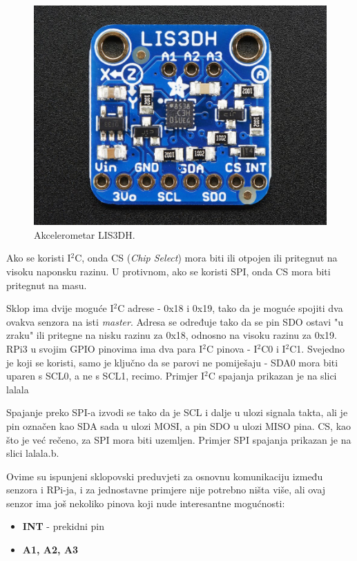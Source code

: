 \documentclass[12pt,a4paper]{article}
\begin{document}
		\begin{figure}[h!]
			\includegraphics[width=\linewidth]{slike/lis3dh.jpg}
			\caption{Akcelerometar LIS3DH.}
			\label{fig:lis3dh}
		\end{figure}

		\par Ako se koristi I$^2$C, onda CS (\textit{Chip Select}) mora biti ili otpojen ili pritegnut na visoku naponsku razinu. U protivnom, ako se koristi SPI, onda CS mora biti pritegnut na masu.

		\par Sklop ima dvije moguće I$^2$C adrese - 0x18 i 0x19, tako da je moguće spojiti dva ovakva senzora na isti \textit{master}. Adresa se određuje tako da se pin SDO ostavi "u zraku" ili pritegne na nisku razinu za 0x18, odnosno na visoku razinu za 0x19. \\
		RPi3 u svojim GPIO pinovima ima dva para I$^2$C pinova - I$^2$C0 i I$^2$C1. Svejedno je koji se koristi, samo je ključno da se parovi ne pomiješaju - SDA0 mora biti uparen s SCL0, a ne s SCL1, recimo. Primjer I$^2$C spajanja prikazan je na slici lalala

		\par Spajanje preko SPI-a izvodi se tako da je SCL i dalje u ulozi signala takta, ali je pin označen kao SDA sada u ulozi MOSI, a pin SDO u ulozi MISO pina. CS, kao što je već rečeno, za SPI mora biti uzemljen. Primjer SPI spajanja prikazan je na slici lalala.b.

		\par Ovime su ispunjeni sklopovski preduvjeti za osnovnu komunikaciju između senzora i RPi-ja, i za jednostavne primjere nije potrebno ništa više, ali ovaj senzor ima još nekoliko pinova koji nude interesantne mogućnosti:
		\begin{itemize}
			\item \textbf{INT} - prekidni pin
			\item \textbf{A1, A2, A3}
		\end{itemize}
\end{document}
